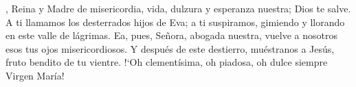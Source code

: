 , Reina y Madre de misericordia, vida, dulzura y esperanza nuestra; Dios te salve.
A ti llamamos los desterrados hijos de Eva; a ti suspiramos, gimiendo y llorando en este valle de lágrimas.
Ea, pues, Señora, abogada nuestra, vuelve a nosotros esos tus ojos misericordiosos. Y después de este destierro, muéstranos a Jesús,
fruto bendito de tu vientre. {!`}Oh clementísima, oh piadosa, oh dulce siempre Virgen María!